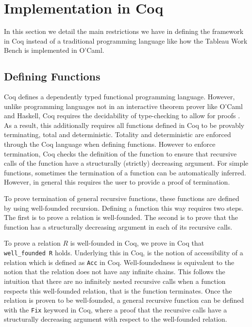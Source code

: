\documentclass{llncs}
\begin{document}
\section{Implementation in Coq}
%
In this section we detail the main restrictions we have in defining the
framework in Coq instead of a traditional programming language like how the
Tableau Work Bench is implemented in O'Caml.
%
\subsection{Defining Functions} \label{Defining Functions}
%
Coq defines a dependently typed functional programming language. However,
unlike programming languages not in an interactive theorem prover like O'Caml
and Haskell, Coq requires the decidability of type-checking to allow for proofs
\cite{barthe2006defining}. As a result, this additionally requires all
functions defined in Coq to be provably terminating, total and deterministic.
Totality and deterministic are enforced through the Coq language when defining
functions. However to enforce termination, Coq checks the definition of the
function to ensure that recursive calls of the function have a structurally
(strictly) decreasing argument. For simple functions, sometimes the termination
of a function can be automatically inferred. However, in general this requires
the user to provide a proof of termination.

To prove termination of general recursive functions, these functions are
defined by using well-founded recursion. Defining a function this way requires
two steps. The first is to prove a relation is well-founded. The second is to
prove that the function has a structurally decreasing argument in each of its
recursive calls.

To prove a relation $R$ is well-founded in Coq, we prove in Coq that
\\\verb+well_founded R+ holds. Underlying this in Coq, is the notion of
accessibility of a relation which is defined as \verb+Acc+ in Coq.
Well-foundedness is equivalent to the notion that the relation does not have
any infinite chains. This follows the intuition that there are no infinitely
nested recursive calls when a function respects this well-founded relation,
that is the function terminates. Once the relation is proven to be
well-founded, a general recursive function can be defined with the \verb+Fix+
keyword in Coq, where a proof that the recursive calls have a structurally 
decreasing argument with respect to the well-founded relation.
\end{document}
